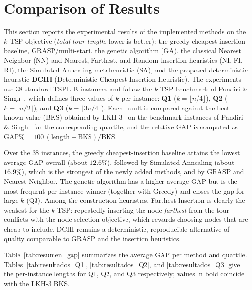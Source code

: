 \documentclass[conference]{IEEEtran}
\begin{document}
\section{Comparison of Results}
This section reports the experimental results of the implemented methods on the $k$-TSP objective (\emph{total tour length}, lower is better): the greedy cheapest-insertion baseline, GRASP/multi-start, the genetic algorithm (GA), the classical Nearest Neighbor (NN) and Nearest, Farthest, and Random Insertion heuristics (NI, FI, RI), the Simulated Annealing metaheuristic (SA), and the proposed deterministic heuristic \textbf{DCIH} (Deterministic Cheapest-Insertion Heuristic). The experiments use 38 standard TSPLIB instances and follow the $k$-TSP benchmark of Pandiri \& Singh~\cite{pandiri2020}, which defines three values of $k$ per instance: \textbf{Q1} ($k=\lfloor n/4\rfloor$), \textbf{Q2} ($k=\lfloor n/2\rfloor$), and \textbf{Q3} ($k=\lfloor 3n/4\rfloor$). Each result is compared against the best-known value (BKS) obtained by LKH-3~\cite{Helsgaun} on the benchmark instances of Pandiri \& Singh~\cite{pandiri2020} for the corresponding quartile, and the relative GAP is computed as $\mathrm{GAP}\%=100\,(\text{length}-\text{BKS})/\text{BKS}$.

Over the 38 instances, the greedy cheapest-insertion baseline attains the lowest average GAP overall (about $12.6\%$), followed by Simulated Annealing (about $16.9\%$), which is the strongest of the newly added methods, and by GRASP and Nearest Neighbor. The genetic algorithm has a higher average GAP but is the most frequent per-instance winner (together with Greedy) and closes the gap for large $k$ (Q3). Among the construction heuristics, Farthest Insertion is clearly the weakest for the $k$-TSP: repeatedly inserting the node \emph{farthest} from the tour conflicts with the node-selection objective, which rewards choosing nodes that are cheap to include. DCIH remains a deterministic, reproducible alternative of quality comparable to GRASP and the insertion heuristics.

Table~\ref{tab:resumen_gap} summarizes the average GAP per method and quartile. Tables~\ref{tab:resultados_Q1}, \ref{tab:resultados_Q2}, and \ref{tab:resultados_Q3} give the per-instance lengths for Q1, Q2, and Q3 respectively; values in bold coincide with the LKH-3 BKS.
\end{document}
